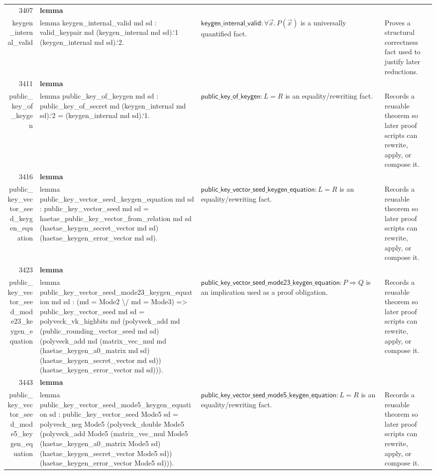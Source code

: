 \documentclass[10pt]{article}
\newcommand{\ec}[1]{\begingroup\ttfamily\scriptsize #1\endgroup}
\begin{document}
\begin{longtable}{r L{0.17\textwidth} L{0.26\textwidth} L{0.27\textwidth} L{0.20\textwidth}}
3407 & \textbf{lemma}\\\ec{keygen\_internal\_valid} & \ec{lemma keygen\_internal\_valid md sd : valid\_keypair md (keygen\_internal md sd).`1 (keygen\_internal md sd).`2.} & \(\mathsf{keygen\_internal\_valid} : \forall \vec{x}.\, P(\vec{x})\) is a universally quantified fact. & Proves a structural correctness fact used to justify later reductions. \\
3411 & \textbf{lemma}\\\ec{public\_key\_of\_keygen} & \ec{lemma public\_key\_of\_keygen md sd : public\_key\_of\_secret md (keygen\_internal md sd).`2 = (keygen\_internal md sd).`1.} & \(\mathsf{public\_key\_of\_keygen} : L = R\) is an equality/rewriting fact. & Records a reusable theorem so later proof scripts can rewrite, apply, or compose it. \\
3416 & \textbf{lemma}\\\ec{public\_key\_vector\_seed\_keygen\_equation} & \ec{lemma public\_key\_vector\_seed\_keygen\_equation md sd : public\_key\_vector\_seed md sd = haetae\_public\_key\_vector\_from\_relation md sd (haetae\_keygen\_secret\_vector md sd) (haetae\_keygen\_error\_vector md sd).} & \(\mathsf{public\_key\_vector\_seed\_keygen\_equation} : L = R\) is an equality/rewriting fact. & Records a reusable theorem so later proof scripts can rewrite, apply, or compose it. \\
3423 & \textbf{lemma}\\\ec{public\_key\_vector\_seed\_mode23\_keygen\_equation} & \ec{lemma public\_key\_vector\_seed\_mode23\_keygen\_equation md sd : (md = Mode2 \textbackslash{}/ md = Mode3) => public\_key\_vector\_seed md sd = polyveck\_vk\_highbits md (polyveck\_add md (public\_rounding\_vector\_seed md sd) (polyveck\_add md (matrix\_vec\_mul md (haetae\_keygen\_a0\_matrix md sd) (haetae\_keygen\_secret\_vector md sd)) (haetae\_keygen\_error\_vector md sd))).} & \(\mathsf{public\_key\_vector\_seed\_mode23\_keygen\_equation} : P \Rightarrow Q\) is an implication used as a proof obligation. & Records a reusable theorem so later proof scripts can rewrite, apply, or compose it. \\
3443 & \textbf{lemma}\\\ec{public\_key\_vector\_seed\_mode5\_keygen\_equation} & \ec{lemma public\_key\_vector\_seed\_mode5\_keygen\_equation sd : public\_key\_vector\_seed Mode5 sd = polyveck\_neg Mode5 (polyveck\_double Mode5 (polyveck\_add Mode5 (matrix\_vec\_mul Mode5 (haetae\_keygen\_a0\_matrix Mode5 sd) (haetae\_keygen\_secret\_vector Mode5 sd)) (haetae\_keygen\_error\_vector Mode5 sd))).} & \(\mathsf{public\_key\_vector\_seed\_mode5\_keygen\_equation} : L = R\) is an equality/rewriting fact. & Records a reusable theorem so later proof scripts can rewrite, apply, or compose it. \\

\end{longtable}
\end{document}
